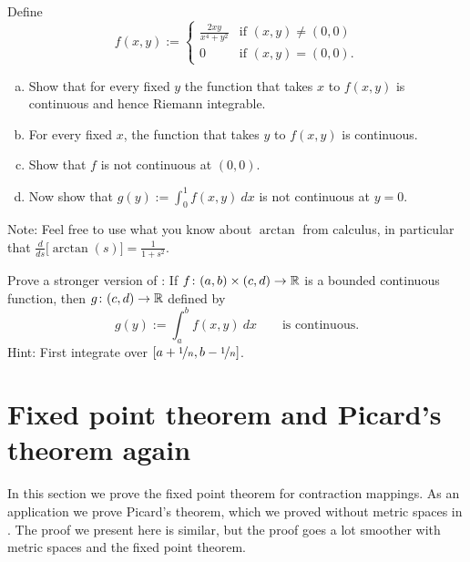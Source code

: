 \begin{exercise}
Define
\begin{equation*}
f(x,y) :=
\begin{cases}
\frac{2xy}{x^4+y^2} & \text{if } (x,y) \not= (0,0) \\
0 & \text{if } (x,y) = (0,0) .
\end{cases}
\end{equation*}
\begin{enumerate}[a)]
\item
Show that for every fixed $y$ the function that takes $x$ to $f(x,y)$
is continuous and hence Riemann integrable.
\item
For every fixed $x$, the function that takes $y$ to $f(x,y)$ is continuous.
\item
Show that $f$ is not continuous at $(0,0)$.
\item
Now show that $g(y) := \int_0^1 f(x,y)~dx$ is not continuous at $y=0$.
\end{enumerate}
Note: Feel free to use what you know about $\arctan$ from calculus,
in particular that $\frac{d}{ds} \bigl[ \arctan(s) \bigr] = \frac{1}{1+s^2}$.
\end{exercise}

\begin{exercise} \label{exercise:integralcontcontextra}
Prove a stronger version of :
If $f \colon (a,b) \times (c,d) \to {\mathbb{R}}$ is a bounded continuous function,
then $g \colon (c,d) \to {\mathbb{R}}$ defined by
\begin{equation*}
g(y) := \int_a^b f(x,y) ~dx  \qquad \text{is continuous}.
\end{equation*}
Hint: First integrate over $[a+\nicefrac{1}{n},b-\nicefrac{1}{n}]$.
\end{exercise}


\sectionnewpage
\section{Fixed point theorem and Picard's theorem again}
\label{sec:metpicard}


In this section we prove the fixed point theorem for contraction
mappings.  As an application we prove Picard's theorem, which we proved
without metric spaces in .
The proof we present here is similar, but the proof goes a lot
smoother with metric spaces and the fixed point theorem.

